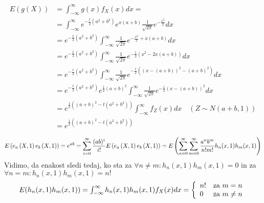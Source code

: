 \documentclass[ letterpaper, titlepage, fleqn]{article}
\begin{document}
{\setlength{\mathindent}{0cm}
\begin{equation*}
\begin{aligned}
E\left(g\left(X\right)\right) & = \int_{-\infty}^{\infty}g\left(x\right)f_X\left(x\right)dx = \\[8px]
&= \int_{-\infty}^{\infty} e^{-\frac{t}{2}(a^2 + b^2)} e^{x \left(a + b\right)} \frac{1}{\sqrt{2\pi}} e^{-\frac{x^2}{2}} dx \\[8px]
&= e^{-\frac{t}{2}\left(a^2 + b^2\right)} \int_{-\infty}^{\infty} \frac{1}{\sqrt{2\pi}} e^{-\frac{x^2}{2} + x \left(a + b\right)} dx \\[8px]
& = e^{-\frac{t}{2} \left(a^2 + b^2\right)} \int_{-\infty}^{\infty} \frac{1}{\sqrt{2\pi}} e^{-\frac{1}{2} \left(x^2 - 2x \left(a + b\right)\right)} dx \\[8px]
&= e^{-\frac{t}{2} \left(a^2 + b^2\right)} \int_{-\infty}^{\infty} \frac{1}{\sqrt{2\pi}} e^{-\frac{1}{2} \left(\left(x - \left(a + b\right)\right)^2 -\left (a + b\right)^2\right)} dx \\[8px]
& = e^{-\frac{t}{2} \left(a^2 + b^2\right)} e^{\frac{1}{2} \left(a + b\right)^2} \int_{-\infty}^{\infty} \frac{1}{\sqrt{2\pi}} e^{-\frac{1}{2} \left(x - \left(a + b\right)\right)^2} dx \\[8px]
& = e^{\frac{1}{2} \left(\left(a + b\right)^2 - t \left(a^2 + b^2\right)\right)} \int_{-\infty}^{\infty} f_Z(x) dx \quad (Z \sim N(a + b, 1)) \\[8px]
& = e^{\frac{1}{2} \left(\left(a + b\right)^2 - t \left(a^2 + b^2\right)\right)}
\end{aligned}
\end{equation*}

\begin{equation*}
E\left(e_a\left(X, 1\right) e_b\left(X, 1\right)\right) = e^{ab} = \sum_{i=0}^{\infty} \frac{(ab)^i}{i!} \\[8px]
E\left(e_a\left(X, 1\right) e_b\left(X, 1\right)\right) = E\left(\sum_{n=0}^{\infty} \sum_{m=0}^{\infty} \frac{a^n b^m}{n! m!} h_n(x, 1) h_m(x, 1)\right) \\[8px]
\end{equation*}
Vidimo, da enakost sledi tedaj, ko sta za $ \forall n \neq m : h_n(x, 1) h_m(x, 1) = 0 $ in za $ \forall n = m : h_n(x, 1) h_m(x, 1) = n! $ \\[10px]
\[
$$
E(h_n(x, 1) h_m(x, 1)) = \int_{-\infty}^{\infty} h_n(x, 1) h_m(x, 1) f_X(x) dx  =
\left\{
\begin{array}{lr}
 n! & \text{za } m = n \\
 0 & \text{za } m \neq n 
 \end{array} 
 \right.
$$
\]
\pagebreak


}
\end{document}
